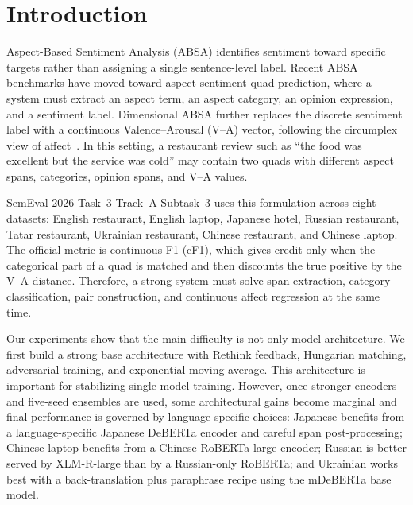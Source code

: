 \documentclass[runningheads]{llncs}
\begin{document}
\section{Introduction}

Aspect-Based Sentiment Analysis (ABSA) identifies sentiment toward
specific targets rather than assigning a single sentence-level label.
Recent ABSA benchmarks have moved toward aspect sentiment quad
prediction, where a system must extract an aspect term, an aspect
category, an opinion expression, and a sentiment label. Dimensional
ABSA further replaces the discrete sentiment label with a continuous
Valence--Arousal (V--A) vector, following the circumplex view of
affect~\cite{russell1980circumplex}. In this setting, a restaurant review such as ``the food was
excellent but the service was cold'' may contain two quads with
different aspect spans, categories, opinion spans, and V--A values.

SemEval-2026 Task~3 Track~A Subtask~3 uses this formulation across
eight datasets: English restaurant, English laptop, Japanese hotel,
Russian restaurant, Tatar restaurant, Ukrainian restaurant, Chinese
restaurant, and Chinese laptop. The official metric is continuous F1
(cF1), which gives credit only when the categorical part of a quad is
matched and then discounts the true positive by the V--A distance.
Therefore, a strong system must solve span extraction, category
classification, pair construction, and continuous affect regression
at the same time.

Our experiments show that the main difficulty is not only model
architecture. We first build a strong base architecture with Rethink
feedback, Hungarian matching, adversarial training, and exponential
moving average. This architecture is important for stabilizing
single-model training. However, once stronger encoders and five-seed
ensembles are used, some architectural gains become marginal and final
performance is governed by language-specific choices: Japanese
benefits from a language-specific Japanese DeBERTa encoder and careful span
post-processing; Chinese laptop benefits from a Chinese RoBERTa large
encoder; Russian is better served by XLM-R-large than by a Russian-only
RoBERTa; and Ukrainian works best with a back-translation plus
paraphrase recipe using the mDeBERTa base model.
\end{document}
